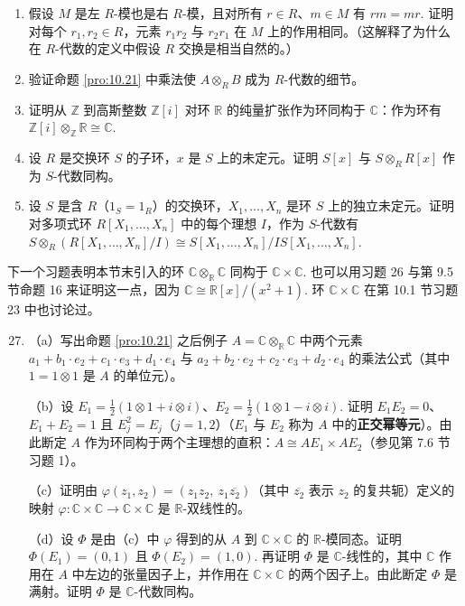 \begin{enumerate}
（b）给出一个例子表明（a）中的映射不必是单射（参见习题 17）。

\item 假设 \(M\) 是左 \(R\)-模也是右 \(R\)-模，且对所有 \(r \in R\)、\(m \in M\) 有 \(rm = mr\). 证明对每个 \(r_1, r_2 \in R\)，元素 \(r_1r_2\) 与 \(r_2r_1\) 在 \(M\) 上的作用相同。（这解释了为什么在 \(R\)-代数的定义中假设 \(R\) 交换是相当自然的。）

\item 验证命题 \ref{pro:10.21} 中乘法使 \(A \otimes_R B\) 成为 \(R\)-代数的细节。

\item 证明从 \(\mathbb{Z}\) 到高斯整数 \(\mathbb{Z}[i]\) 对环 \(\mathbb{R}\) 的纯量扩张作为环同构于 \(\mathbb{C}\)：作为环有 \(\mathbb{Z}[i] \otimes_{\mathbb{Z}} \mathbb{R} \cong \mathbb{C}\).

\item 设 \(R\) 是交换环 \(S\) 的子环，\(x\) 是 \(S\) 上的未定元。证明 \(S[x]\) 与 \(S \otimes_R R[x]\) 作为 \(S\)-代数同构。

\item 设 \(S\) 是含 \(R\)（\(1_S = 1_R\)）的交换环，\(X_1, \ldots, X_n\) 是环 \(S\) 上的独立未定元。证明对多项式环 \(R[X_1, \ldots, X_n]\) 中的每个理想 \(I\)，作为 \(S\)-代数有 \(S \otimes_R (R[X_1, \ldots, X_n]/I) \cong S[X_1, \ldots, X_n]/IS[X_1, \ldots, X_n]\).
\end{enumerate}

\noindent 下一个习题表明本节末引入的环 \(\mathbb{C} \otimes_{\mathbb{R}} \mathbb{C}\) 同构于 \(\mathbb{C} \times \mathbb{C}\). 也可以用习题 26 与第 9.5 节命题 16 来证明这一点，因为 \(\mathbb{C} \cong \mathbb{R}[x]/(x^2+1)\). 环 \(\mathbb{C} \times \mathbb{C}\) 在第 10.1 节习题 23 中也讨论过。

\begin{enumerate}
\setcounter{enumi}{26}
\item （a）写出命题 \ref{pro:10.21} 之后例子 \(A = \mathbb{C} \otimes_{\mathbb{R}} \mathbb{C}\) 中两个元素 \(a_1+b_1 \cdot e_2+c_1 \cdot e_3+d_1 \cdot e_4\) 与 \(a_2+b_2 \cdot e_2+c_2 \cdot e_3+d_2 \cdot e_4\) 的乘法公式（其中 \(1 = 1 \otimes 1\) 是 \(A\) 的单位元）。

（b）设 \(E_1 = \frac{1}{2}(1 \otimes 1+i \otimes i)\)、\(E_2 = \frac{1}{2}(1 \otimes 1-i \otimes i)\). 证明 \(E_1E_2 = 0\)、\(E_1+E_2 = 1\) 且 \(E_j^2 = E_j\)（\(j = 1, 2\)）（\(E_1\) 与 \(E_2\) 称为 \(A\) 中的\textbf{正交幂等元}）。由此断定 \(A\) 作为环同构于两个主理想的直积：\(A \cong AE_1 \times AE_2\)（参见第 7.6 节习题 1）。

（c）证明由 \(\varphi(z_1, z_2) = (z_1z_2,\ z_1\overline{z_2})\)（其中 \(\overline{z_2}\) 表示 \(z_2\) 的复共轭）定义的映射 \(\varphi : \mathbb{C} \times \mathbb{C} \to \mathbb{C} \times \mathbb{C}\) 是 \(\mathbb{R}\)-双线性的。

（d）设 \(\Phi\) 是由（c）中 \(\varphi\) 得到的从 \(A\) 到 \(\mathbb{C} \times \mathbb{C}\) 的 \(\mathbb{R}\)-模同态。证明 \(\Phi(E_1) = (0, 1)\) 且 \(\Phi(E_2) = (1, 0)\). 再证明 \(\Phi\) 是 \(\mathbb{C}\)-线性的，其中 \(\mathbb{C}\) 作用在 \(A\) 中左边的张量因子上，并作用在 \(\mathbb{C} \times \mathbb{C}\) 的两个因子上。由此断定 \(\Phi\) 是满射。证明 \(\Phi\) 是 \(\mathbb{C}\)-代数同构。
\end{enumerate}

